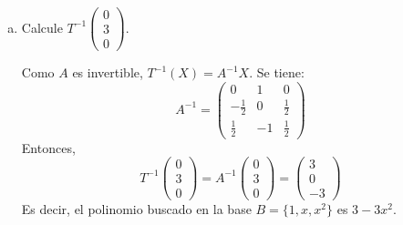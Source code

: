 \begin{example}
\begin{enumerate}[a.]
    \item Calcule $T^{-1} \begin{pmatrix} 0 \\ 3 \\ 0 \end{pmatrix}$.
    \begin{myproof}
    Como $A$ es invertible, $T^{-1}(X) = A^{-1} X$. Se tiene:
    \[
    A^{-1} = \begin{pmatrix}
        0 & 1 & 0 \\
        -\frac{1}{2} & 0 & \frac{1}{2} \\
        \frac{1}{2} & -1 & \frac{1}{2}
    \end{pmatrix}
    \]
    Entonces,
    \[
    T^{-1} \begin{pmatrix} 0 \\ 3 \\ 0 \end{pmatrix}
    = A^{-1} \begin{pmatrix} 0 \\ 3 \\ 0 \end{pmatrix}
    = \begin{pmatrix} 3 \\ 0 \\ -3 \end{pmatrix}
    \]
    Es decir, el polinomio buscado en la base $B = \{1, x, x^2\}$ es $3 - 3x^2$.
    \end{myproof}
\end{enumerate}
\end{example}



